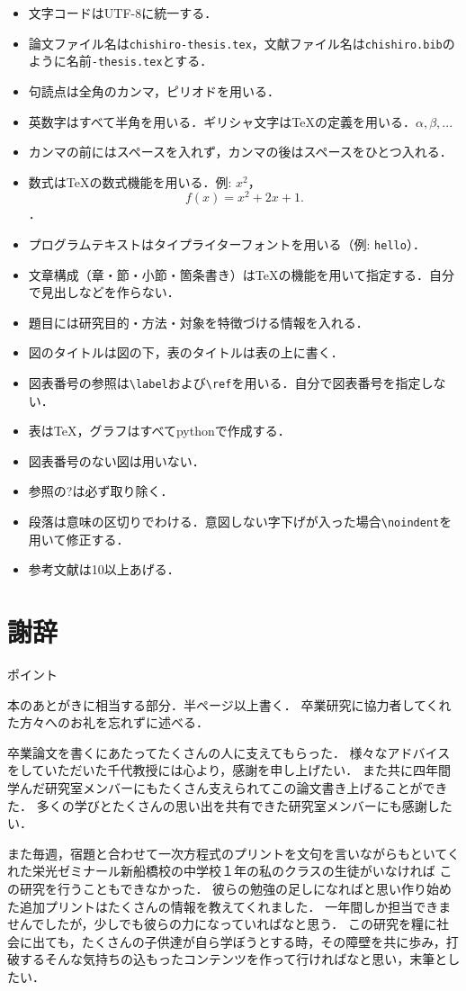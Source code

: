 \documentclass[a4j,11pt,report]{jsbook}
\newcommand{\point}[1]{
\begin{itembox}[l]{ポイント}
  #1
\end{itembox}
}
\begin{document}
\begin{itemize}
  \item 文字コードはUTF-8に統一する．
  \item 論文ファイル名は\texttt{chishiro-thesis.tex}，文献ファイル名は\texttt{chishiro.bib}のように名前\texttt{-thesis.tex}とする．
  \item 句読点は全角のカンマ，ピリオドを用いる．
  \item 英数字はすべて半角を用いる．ギリシャ文字は{\TeX}の定義を用いる．$\alpha, \beta, ...$
  \item カンマの前にはスペースを入れず，カンマの後はスペースをひとつ入れる．
  \item 数式は{\TeX}の数式機能を用いる．例: $x^2$，\[f(x) = x^2 + 2x + 1.\]．
  \item プログラムテキストはタイプライターフォントを用いる（例: \texttt{hello}）．
  \item 文章構成（章・節・小節・箇条書き）は{\TeX}の機能を用いて指定する．自分で見出しなどを作らない．
  \item 題目には研究目的・方法・対象を特徴づける情報を入れる．
  \item 図のタイトルは図の下，表のタイトルは表の上に書く．
  \item 図表番号の参照は\verb#\label#および\verb#\ref#を用いる．自分で図表番号を指定しない．
  \item 表は{\TeX}，グラフはすべてpythonで作成する．
  \item 図表番号のない図は用いない．
  \item 参照の?は必ず取り除く．
  \item 段落は意味の区切りでわける．意図しない字下げが入った場合\verb#\noindent#を用いて修正する．
  \item 参考文献は10以上あげる．
\end{itemize}


\chapter*{謝辞 \label{ch:acknowledgement}}
\thispagestyle{empty}
\point{
本のあとがきに相当する部分．半ページ以上書く．
卒業研究に協力者してくれた方々へのお礼を忘れずに述べる．
}

卒業論文を書くにあたってたくさんの人に支えてもらった．
様々なアドバイスをしていただいた千代教授には心より，感謝を申し上げたい．
また共に四年間学んだ研究室メンバーにもたくさん支えられてこの論文書き上げることができた．
多くの学びとたくさんの思い出を共有できた研究室メンバーにも感謝したい．

また毎週，宿題と合わせて一次方程式のプリントを文句を言いながらもといてくれた栄光ゼミナール新船橋校の中学校１年の私のクラスの生徒がいなければ
この研究を行うこともできなかった．
彼らの勉強の足しになればと思い作り始めた追加プリントはたくさんの情報を教えてくれました．
一年間しか担当できませんでしたが，少しでも彼らの力になっていればなと思う．
この研究を糧に社会に出ても，たくさんの子供達が自ら学ぼうとする時，その障壁を共に歩み，打破するそんな気持ちの込もったコンテンツを作って行ければなと思い，末筆としたい．
\end{document}
